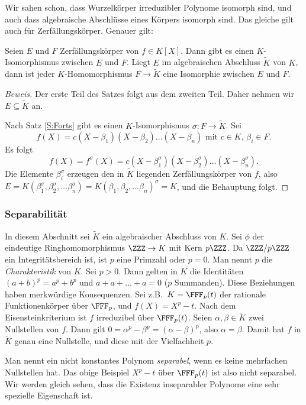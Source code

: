 \documentclass[12pt,a4paper,twoside]{article}
\newcommand{\ei}[1]{\emph{#1}\index{#1}}
\begin{document}
Wir sahen schon, dass Wurzelk\"orper irreduzibler Polynome isomorph sind, und
auch dass algebraische Abschl\"usse eines K\"orpers isomorph sind. Das gleiche
gilt auch f\"ur Zerf\"allungsk\"orper. Genauer gilt:
\begin{Satz}
  Seien $E$ und $F$ Zerf\"allungsk\"orper von $f\in K[X]$. Dann gibt es einen
  $K$-Isomorphismus zwischen $E$ und $F$. Liegt $E$ im algebraischen Abschluss
  $\tilde K$ von $K$, dann ist jeder $K$-Homomorphismus $F\to\tilde K$ eine
  Isomorphie zwischen $E$ und $F$.
\end{Satz}
\begin{proof}[Beweis]
Der erste Teil des Satzes folgt aus dem zweiten Teil. Daher nehmen wir
  $E\subseteq \tilde K$ an.
  
  Nach Satz \ref{S:Forts} gibt es einen $K$-Isomorphismus $\sigma:F\to\tilde
  K$. Sei
\[
f(X)=c(X-\beta_1)(X-\beta_2)\dots(X-\beta_n)\text{ mit $c\in K$, $\beta_i\in
  F$.}
\]
Es folgt
\[
f(X)=f^\sigma(X)=c(X-\beta_1^\sigma)(X-\beta_2^\sigma)\dots(X-\beta_n^\sigma).
\]
Die Elemente $\beta_i^\sigma$ erzeugen den in $\tilde K$ liegenden
Zerf\"allungsk\"orper von $f$, also
$E=K(\beta_1^\sigma,\beta_2^\sigma,\dots\beta_n^\sigma)=
K(\beta_1,\beta_2,\dots\beta_n)^\sigma=K$, und die Behauptung folgt.
\end{proof}
\subsubsection{Separabilit\"at}
In diesem Abschnitt sei $\tilde K$ ein algebraischer Abschluss von $K$. Sei
$\phi$ der eindeutige Ringhomomorphismus $\ZZZ\to K$ mit Kern $p\ZZZ$. Da
$\ZZZ/p\ZZZ$ ein Integrit\"atsbereich ist, ist $p$ eine Primzahl oder $p=0$.
Man nennt $p$ die \ei{Charakteristik} von $K$. Sei $p>0$. Dann gelten in $K$
die Identit\"aten $(a+b)^p=a^p+b^p$ und $a+a+\dots+a=0$ ($p$ Summanden). Diese
Beziehungen haben merkw\"urdige Konsequenzen. Sei z.B.\ $K=\FFF_p(t)$ der
rationale Funktionenk\"orper \"uber $\FFF_p$, und $f(X)=X^p-t$. Nach dem
Eisensteinkriterium ist $f$ irreduzibel \"uber $\FFF_p(t)$. Seien
$\alpha,\beta\in\tilde K$ zwei Nullstellen von $f$. Dann gilt
$0=\alpha^p-\beta^p=(\alpha-\beta)^p$, also $\alpha=\beta$. Damit hat $f$ in
$\tilde K$ genau eine Nullstelle, und diese mit der Vielfachheit $p$.

Man nennt ein nicht konstantes Polynom \ei{separabel}, wenn es keine
mehrfachen Nullstellen hat. Das obige Beispiel $X^p-t$ \"uber $\FFF_p(t)$ ist
also nicht separabel. Wir werden gleich sehen, dass die Existenz inseparabler
Polynome eine sehr spezielle Eigenschaft ist.
\end{document}
